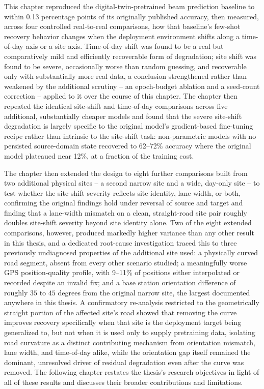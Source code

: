 \documentclass{iutbscthesis}
\begin{document}
This chapter reproduced the digital-twin-pretrained beam prediction baseline to within 0.13 percentage points of its originally published accuracy, then measured, across four controlled real-to-real comparisons, how that baseline's few-shot recovery behavior changes when the deployment environment shifts along a time-of-day axis or a site axis. Time-of-day shift was found to be a real but comparatively mild and efficiently recoverable form of degradation; site shift was found to be severe, occasionally worse than random guessing, and recoverable only with substantially more real data, a conclusion strengthened rather than weakened by the additional scrutiny -- an epoch-budget ablation and a seed-count correction -- applied to it over the course of this chapter. The chapter then repeated the identical site-shift and time-of-day comparisons across five additional, substantially cheaper models and found that the severe site-shift degradation is largely specific to the original model's gradient-based fine-tuning recipe rather than intrinsic to the site-shift task: non-parametric models with no persisted source-domain state recovered to 62--72\% accuracy where the original model plateaued near 12\%, at a fraction of the training cost.

The chapter then extended the design to eight further comparisons built from two additional physical sites -- a second narrow site and a wide, day-only site -- to test whether the site-shift severity reflects site identity, lane width, or both, confirming the original findings hold under reversal of source and target and finding that a lane-width mismatch on a clean, straight-road site pair roughly doubles site-shift severity beyond site identity alone. Two of the eight extended comparisons, however, produced markedly higher variance than any other result in this thesis, and a dedicated root-cause investigation traced this to three previously undiagnosed properties of the additional site used: a physically curved road segment, absent from every other scenario studied; a meaningfully worse GPS position-quality profile, with 9--11\% of positions either interpolated or recorded despite an invalid fix; and a base station orientation difference of roughly $35$ to $45$ degrees from the original narrow site, the largest documented anywhere in this thesis. A confirmatory re-analysis restricted to the geometrically straight portion of the affected site's road showed that removing the curve improves recovery specifically when that site is the deployment target being generalized to, but not when it is used only to supply pretraining data, isolating road curvature as a distinct contributing mechanism from orientation mismatch, lane width, and time-of-day alike, while the orientation gap itself remained the dominant, unresolved driver of residual degradation even after the curve was removed. The following chapter restates the thesis's research objectives in light of all of these results and discusses their broader contributions and limitations.
\end{document}
